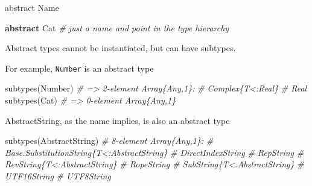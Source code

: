 \documentclass[ignorenonframetext,]{beamer}
\newenvironment{Shaded}{}{}
\newcommand{\KeywordTok}[1]{\textcolor[rgb]{0.00,0.44,0.13}{\textbf{{#1}}}}
\newcommand{\DataTypeTok}[1]{\textcolor[rgb]{0.56,0.13,0.00}{{#1}}}
\newcommand{\CommentTok}[1]{\textcolor[rgb]{0.38,0.63,0.69}{\textit{{#1}}}}
\newcommand{\NormalTok}[1]{{#1}}
\begin{document}
\begin{frame}[fragile]{abstract Name}

\begin{Shaded}
\begin{Highlighting}[]
\KeywordTok{abstract} \NormalTok{Cat }\CommentTok{# just a name and point in the type hierarchy}
\end{Highlighting}
\end{Shaded}

\end{frame}

\begin{frame}[fragile]{Abstract types cannot be instantiated, but can
have subtypes.}

For example, \texttt{Number} is an abstract type

\begin{Shaded}
\begin{Highlighting}[]
\NormalTok{subtypes(}\DataTypeTok{Number}\NormalTok{) }\CommentTok{# => 2-element Array\{Any,1\}:}
                 \CommentTok{#     Complex\{T<:Real\}}
                 \CommentTok{#     Real}
\NormalTok{subtypes(Cat) }\CommentTok{# => 0-element Array\{Any,1\}}
\end{Highlighting}
\end{Shaded}

\end{frame}

\begin{frame}[fragile]{AbstractString, as the name implies, is also an
abstract type}

\begin{Shaded}
\begin{Highlighting}[]
\NormalTok{subtypes(AbstractString)    }\CommentTok{# 8-element Array\{Any,1\}:}
                            \CommentTok{#  Base.SubstitutionString\{T<:AbstractString\}}
                            \CommentTok{#  DirectIndexString}
                            \CommentTok{#  RepString}
                            \CommentTok{#  RevString\{T<:AbstractString\}}
                            \CommentTok{#  RopeString}
                            \CommentTok{#  SubString\{T<:AbstractString\}}
                            \CommentTok{#  UTF16String}
                            \CommentTok{#  UTF8String}
\end{Highlighting}
\end{Shaded}

\end{frame}
\end{document}
